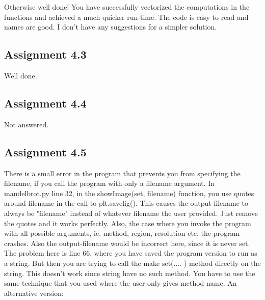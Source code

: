 \documentclass[a4paper]{article}
\begin{document}
\text Otherwise well done! You have successfully vectorized the computations in the functions and achieved a much quicker run-time. The code is easy to read and names are good. I don't have any suggestions for a simpler solution.

\subsection*{Assignment 4.3}
\text Well done. 

\subsection*{Assignment 4.4}
\text Not answered.

\subsection*{Assignment 4.5}
\text There is a small error in the program that prevents you from specifying the filename, if you call the program with only a filename argument. In mandelbrot.py line 32, in the showImage(set, filename) function, you use quotes around filename in the call to plt.savefig(). This causes the output-filename to always be "filename" instead of whatever filename the user provided. Just remove the quotes and it works perfectly. Also, the case where you invoke the program with all possible arguments, ie. method, region, resolution etc. the program crashes. Also the output-filename would be incorrect here, since it is never set. \\
The problem here is line 66, where you have saved the program version to run as a string. But then you are trying to call the make set(.... ) method directly on the string. This doesn't work since string have no such method. You have to use the same technique that you used where the user only gives method-name. An alternative version: 
\end{document}
